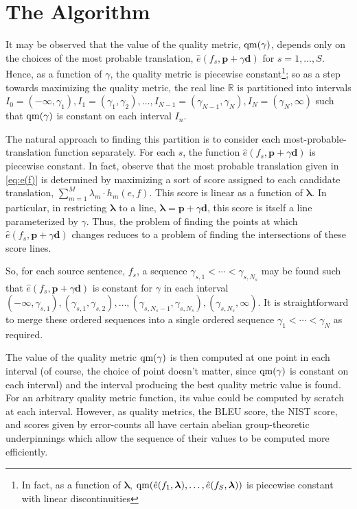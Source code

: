 \documentclass[12pt]{amsart}
\newcommand{\qm}{{\rm qm}}
\begin{document}
\section{The Algorithm\label{sec:algo}}
It may be observed that the value of the quality metric, $\qm(\gamma)$, depends only on the choices of the most probable translation, $\hat{e}(f_s, \boldsymbol{p} + \gamma \boldsymbol{d})$ for $s = 1 , \dots , S$.
Hence, as a function of $\gamma$, the quality metric is piecewise constant\footnote{In fact, as a function of $\boldsymbol{\lambda}$, $\qm(\hat{e}(f_1, \boldsymbol{\lambda}), \dots , \hat{e}(f_S, \boldsymbol{\lambda}))$ is piecewise constant with linear discontinuities}; so as a step towards maximizing the quality metric, the real line $\mathbb{R}$ is partitioned into intervals $I_0 = (-\infty, \gamma_1), I_1 = (\gamma_1, \gamma_2), \dots , I_{N-1} = (\gamma_{N-1}, \gamma_N), I_N = (\gamma_N, \infty)$ such that $\qm(\gamma)$ is constant on each interval $I_n$.

The natural approach to finding this partition is to consider each most-probable-translation function separately.
For each $s$, the function $\hat{e}(f_s, \boldsymbol{p} + \gamma \boldsymbol{d})$ is piecewise constant.
In fact, observe that the most probable translation given in \eqref{eq:e(f)} is determined by maximizing a sort of score assigned to each candidate translation, $\sum_{m=1}^M \lambda_m \cdot h_m(e,f)$.
This score is linear as a function of $\boldsymbol{\lambda}$.
In particular, in restricting $\boldsymbol{\lambda}$ to a line, $\boldsymbol{\lambda} = \boldsymbol{p} + \gamma \boldsymbol{d}$, this score is itself a line parameterized by $\gamma$.
Thus, the problem of finding the points at which $\hat{e}(f_s, \boldsymbol{p} + \gamma \boldsymbol{d})$ changes reduces to a problem of finding the intersections of these score lines.

So, for each source sentence, $f_s$, a sequence $\gamma_{s,1} < \cdots < \gamma_{s,N_s}$ may be found such that $\hat{e}(f_s, \boldsymbol{p} + \gamma \boldsymbol{d})$ is constant for $\gamma$ in each interval $(-\infty, \gamma_{s,1}), (\gamma_{s,1}, \gamma_{s,2}), \dots , (\gamma_{s,N_s-1}, \gamma_{s,N_s}), (\gamma_{s,N_s}, \infty)$.
It is straightforward to merge these ordered sequences into a single ordered sequence $\gamma_1 < \cdots < \gamma_N$ as required.

The value of the quality metric $\qm(\gamma)$ is then computed at one point in each interval (of course, the choice of point doesn't matter, since $\qm(\gamma)$ is constant on each interval) and the interval producing the best quality metric value is found.
For an arbitrary quality metric function, its value could be computed by scratch at each interval.
However, as quality metrics, the BLEU score, the NIST score, and scores given by error-counts all have certain abelian group-theoretic underpinnings which allow the sequence of their values to be computed more efficiently.
\end{document}
